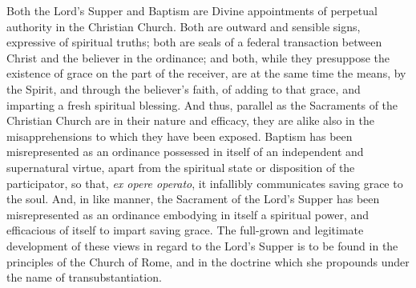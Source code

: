 \documentclass[
  english,
]{book}
\providecommand{\textlatin}{}
\renewcommand{\textlatin}[2][]{\foreignlanguage{latin}{#2}}
\begin{document}
Both the Lord's Supper and Baptism are Divine appointments of perpetual authority in the Christian Church. Both are outward and sensible signs, expressive of spiritual truths; both are seals of a federal transaction between Christ and the believer in the ordinance; and both, while they presuppose the existence of grace on the part of the receiver, are at the same time the means, by the Spirit, and through the believer's faith, of adding to that grace, and imparting a fresh spiritual blessing. And thus, parallel as the Sacraments of the Christian Church are in their nature and efficacy, they are alike also in the misapprehensions to which they have been exposed. Baptism has been misrepresented as an ordinance possessed in itself of an independent and supernatural virtue, apart from the spiritual state or disposition of the participator, so that, \textlatin{\emph{ex opere operato}}, it infallibly communicates saving grace to the soul. And, in like manner, the Sacrament of the Lord's Supper has been misrepresented as an ordinance embodying in itself a spiritual power, and efficacious of itself to impart saving grace. The full-grown and legitimate development of these views in regard to the Lord's Supper is to be found in the principles of the Church of Rome, and in the doctrine which she propounds under the name of transubstantiation.
\end{document}
